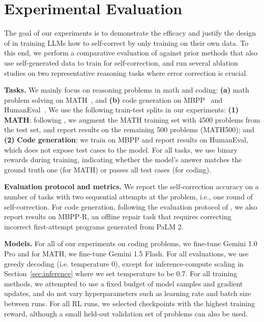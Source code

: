 \vspace{-0.1cm}
\section{Experimental Evaluation}
\label{sec:experiments}
\vspace{-0.2cm}
The goal of our experiments is to demonstrate the efficacy and justify the design of \methodname{} in training LLMs how to self-correct by only training on their own data. To this end, we perform a comparative evaluation of \methodname{} against prior methods that also use self-generated data to train for self-correction, and run several ablation studies on two representative reasoning tasks where error correction is crucial.

\textbf{Tasks.} We mainly focus on reasoning problems in math and coding: \textbf{(a)} math problem solving on MATH~\citep{hendrycksmath2021}, and \textbf{(b)} code generation on MBPP~\citep{austin2021program} and HumanEval~\citep{chen2021evaluating}. We use the following train-test splits in our experiments: \textbf{(1)} \textbf{MATH}: following \cite{lightman2023let}, we augment the MATH training set with 4500 problems from the test set, and report results on the remaining 500 problems (MATH500); and \textbf{(2)} \textbf{Code generation}: we train on MBPP and report results on HumanEval, which does not expose test cases to the model. For all tasks, we use binary rewards during training, indicating whether the model's answer matches the ground truth one (for MATH) or passes all test cases (for coding).

\textbf{Evaluation protocol and metrics.} We report the self-correction accuracy on a number of tasks with two sequential attempts at the problem, i.e., one round of self-correction. For code generation, following the evaluation protocol of \citet{ni2024next}, we also report results on MBPP-R, an offline repair task that requires correcting incorrect first-attempt programs generated from PaLM 2.

\textbf{Models.} For all of our experiments on coding problems, we fine-tune Gemini 1.0 Pro and for MATH, we fine-tune Gemini 1.5 Flash. For all evaluations, we use greedy decoding (i.e. temperature 0), except for inference-compute scaling in Section~\ref{sec:inference} where we set temperature to be 0.7. For all training methods, we attempted to use a fixed budget of model samples and gradient updates, and do not vary hyperparameters such as learning rate and batch size between runs. For all RL runs, we selected checkpoints with the highest training reward, although a small held-out validation set of problems can also be used. 

